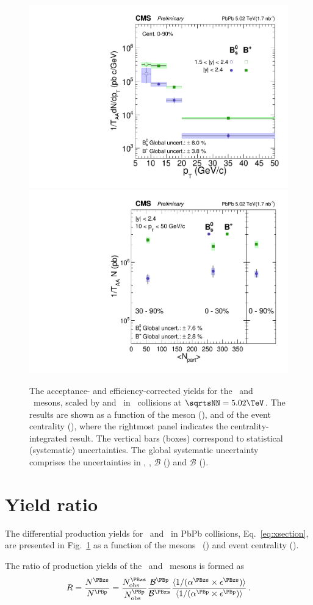 \begin{figure}[t]
\centering
\includegraphics[width=.48\textwidth]{xsect_vsPt.pdf}
\includegraphics[width=.48\textwidth]{xsect_vsCent.pdf}
\caption{The acceptance- and efficiency-corrected yields for the \PBp\  and \PBzs\ mesons, scaled by \TAA and \NMB\ in \PbPb\ collisions at $\sqrtsNN=5.02\TeV$. The results are shown as a function of the meson \pt (\cmsLeft), and of the event centrality (\cmsRight), where the rightmost panel indicates the centrality-integrated result.  The vertical bars (boxes) correspond to statistical (systematic) uncertainties. The global systematic uncertainty comprises the uncertainties in \TAA, \NMB, $\mathcal{B}$ (\cmsLeft) and $\mathcal{B}$ (\cmsRight).
}
\label{fig:xsections}
\end{figure}



\section{Yield ratio}

The differential production yields for \PBzs\ and \PBp\ in PbPb collisions, Eq.~\ref{eq:xsection}, 
are presented in Fig.~\ref{fig:xsections} as a function of the mesons \pt\ (\cmsLeft) and event centrality (\cmsRight).

The ratio of production yields of the \PBzs\ and \PBp\ mesons
is formed as
%
\begin{equation}
R = \frac{N^{\PBzs}}{N^{\PBp}} = 
\frac{N_{\rm{obs}}^{\PBzs}}{N_{\rm{obs}}^{\PBp}}
\frac{ \mathcal{B}^{\PBp}}{ \mathcal{B}^{\PBzs}} 
\frac{\langle 1/(\alpha^{\PBzs} \times \epsilon^{\PBzs})\rangle}
     {\langle 1/(\alpha^{\PBp}  \times \epsilon^{\PBp} )\rangle}
\, .
\label{eq:ratio}
\end{equation}
%

